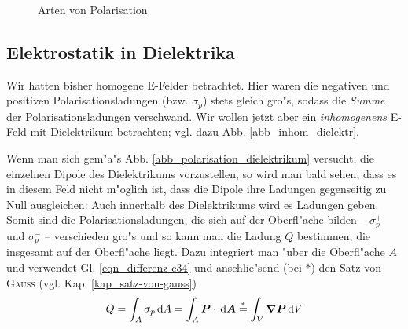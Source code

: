 \begin{figure}
   \centering
{}
\hfill
{}
   \caption{Arten von Polarisation}
   \label{abb_polarisationsarten}
\end{figure}









\subsection{Elektrostatik in Dielektrika}
\label{kap_elektrostatik-in-dielektrika}

Wir hatten bisher homogene E-Felder betrachtet. Hier waren die
negativen und positiven Polarisationsladungen (bzw. $\sigma_p$) stets
gleich gro"s, sodass die \emph{Summe} der Polarisationsladungen
verschwand. Wir wollen jetzt aber ein \emph{inhomogenens} E-Feld
mit Dielektrikum betrachten; vgl. dazu Abb. \ref{abb_inhom_dielektr}.

Wenn man sich gem"a"s Abb. \ref{abb_polarisation_dielektrikum} versucht,
die einzelnen Dipole des Dielektrikums vorzustellen, so wird man bald
sehen, dass es in diesem Feld nicht m"oglich ist, dass die Dipole ihre
Ladungen gegenseitig zu Null ausgleichen: Auch innerhalb des
Dielektrikums wird es Ladungen geben. Somit sind die
Polarisationsladungen, die sich auf der Oberfl"ache bilden --
$\sigma_p^+$ und $\sigma_p^-$ -- verschieden gro"s und so kann man die
Ladung $Q$ bestimmen, die insgesamt auf der Oberfl"ache liegt. Dazu
integriert man "uber die Oberfl"ache $A$ und verwendet
Gl. \eqref{eqn_differenz-c34} und anschlie"send (bei $*$) den Satz von
\textsc{Gauss} (vgl. Kap. \ref{kap_satz-von-gauss})
\begin{equation}
   \label{eqn_differenz-c45}
   Q = \int_A \sigma_p \, \mathrm{d} A = \int_A
   \boldsymbol{P} \cdot \, \mathrm{d} \boldsymbol{A}
\stackrel{*}{=} \int_V \boldsymbol{\nabla} \boldsymbol{P} \, \mathrm{d} V
\end{equation}

